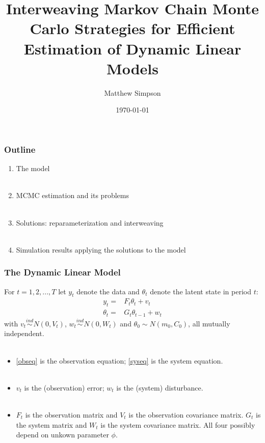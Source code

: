 \documentclass[xcolor=dvipsnames]{beamer}
\title[Interweaving MCMC Strats for DLMs]{Interweaving Markov Chain Monte Carlo Strategies for Efficient
Estimation of Dynamic Linear Models}
\author[M. Simpson]{Matthew Simpson}
\date{\today}
\institute[Deps of Stat \& Econ, ISU]{Departments of Statistics and Economics, Iowa State University}
\begin{document}
\begin{frame}
\titlepage
\end{frame}

\begin{frame}
  \frametitle{Outline}
  \begin{enumerate}
    \item The model\\~\\
    \item MCMC estimation and its problems\\~\\
    \item Solutions: reparameterization and interweaving\\~\\
    \item Simulation results applying the solutions to the model
  \end{enumerate}
\end{frame}

\begin{frame}
  \frametitle{The Dynamic Linear Model} 
  For $t=1,2,...,T$ let $y_t$ denote the data and $\theta_t$ denote the latent state in period $t$:
  \begin{align}
    y_t  =&F_t\theta_t +  v_t\label{obseq}\\
    \theta_t =& G_t\theta_{t-1} + w_t\label{syseq}
  \end{align} 
  with $v_t\stackrel{ind}{\sim}N(0,V_t)$, $w_t\stackrel{ind}{\sim}N(0,W_t)$ and $\theta_0\sim N(m_0,C_0)$, all mutually independent.\\~\\
  \begin{itemize}%
  \item \eqref{obseq} is the observation equation; \eqref{syseq} is the system equation. \\~\\
  \item $v_t$ is the (observation) error; $w_t$ is the (system) disturbance. \\~\\
  \item $F_t$ is the observation matrix and $V_t$ is the observation covariance matrix. $G_t$ is the system matrix and  $W_t$ is the system covariance matrix. All four possibly depend on unkown parameter $\phi$.
  \end{itemize}
\end{frame}
\end{document}

